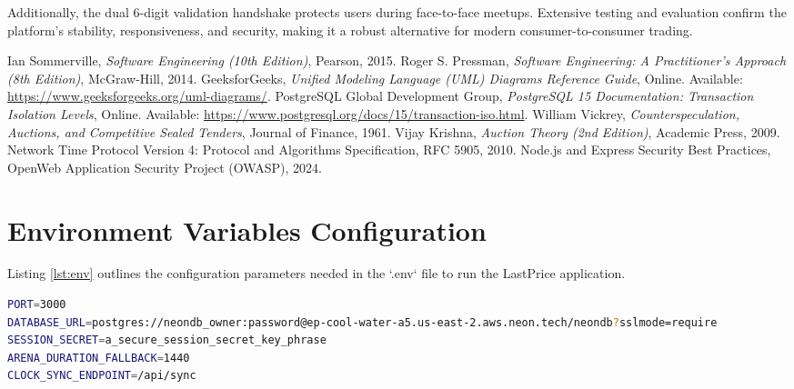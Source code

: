 \documentclass[12pt,a4paper,oneside]{report}
\begin{document}
Additionally, the dual 6-digit validation handshake protects users during face-to-face meetups. Extensive testing and evaluation confirm the platform's stability, responsiveness, and security, making it a robust alternative for modern consumer-to-consumer trading.

\begin{thebibliography}{10}
Ian Sommerville, \emph{Software Engineering (10th Edition)}, Pearson, 2015.
Roger S. Pressman, \emph{Software Engineering: A Practitioner's Approach (8th Edition)}, McGraw-Hill, 2014.
GeeksforGeeks, \emph{Unified Modeling Language (UML) Diagrams Reference Guide}, Online. Available: \url{https://www.geeksforgeeks.org/uml-diagrams/}.
PostgreSQL Global Development Group, \emph{PostgreSQL 15 Documentation: Transaction Isolation Levels}, Online. Available: \url{https://www.postgresql.org/docs/15/transaction-iso.html}.
William Vickrey, \emph{Counterspeculation, Auctions, and Competitive Sealed Tenders}, Journal of Finance, 1961.
Vijay Krishna, \emph{Auction Theory (2nd Edition)}, Academic Press, 2009.
Network Time Protocol Version 4: Protocol and Algorithms Specification, RFC 5905, 2010.
Node.js and Express Security Best Practices, OpenWeb Application Security Project (OWASP), 2024.
\end{thebibliography}

\appendix

\chapter{Environment Variables Configuration}
Listing \ref{lst:env} outlines the configuration parameters needed in the `.env` file to run the LastPrice application.

\begin{lstlisting}[language=bash, label={lst:env}, caption={Environment Variables Template}]
PORT=3000
DATABASE_URL=postgres://neondb_owner:password@ep-cool-water-a5.us-east-2.aws.neon.tech/neondb?sslmode=require
SESSION_SECRET=a_secure_session_secret_key_phrase
ARENA_DURATION_FALLBACK=1440
CLOCK_SYNC_ENDPOINT=/api/sync
\end{lstlisting}
\end{document}
